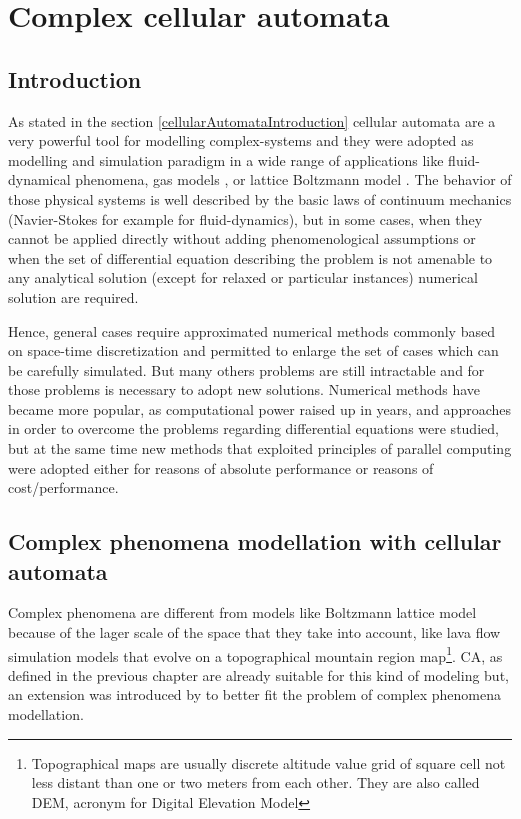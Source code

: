 \chapter{Complex cellular automata}

\section{Introduction}
As stated in the section \ref{cellularAutomataIntroduction} cellular automata
are a very powerful tool for modelling complex-systems and they were adopted as
modelling and simulation paradigm in a wide range of applications like
fluid-dynamical phenomena, gas models \cite{Frisch1986}, or lattice Boltzmann
model \cite{Chopard1999}.
The behavior of those physical systems is well described  by the basic laws
of continuum mechanics (Navier-Stokes for example for fluid-dynamics),
but in some cases, when  they cannot be applied directly without adding
phenomenological assumptions or when the set of differential equation
describing the problem is not amenable to any analytical solution (except for
relaxed or particular instances) numerical solution are required.

Hence, general cases require approximated numerical methods commonly based on
space-time discretization and permitted to enlarge the set of cases which can be
carefully simulated.
But many others problems are still intractable and for those problems is
necessary to adopt new solutions. Numerical methods have became more
popular, as computational power raised up in years, and approaches in order to
overcome the problems regarding differential equations\cite{Toffoli1984} were
studied, but at the same time new methods that exploited principles of parallel
computing were adopted either for reasons of absolute performance or reasons of
cost/performance.

\section{Complex phenomena modellation with cellular automata}
Complex phenomena are different from models like Boltzmann lattice model
because of the lager scale of the space that they take into account, like lava
flow simulation models that evolve on a topographical mountain
region map\footnote{Topographical maps are usually discrete altitude value grid
of square cell not less distant than one or two meters from each other. They are
also called DEM, acronym for Digital Elevation Model}.
CA, as defined in the previous chapter are already suitable for this kind of modeling
but, an extension  was introduced by \cite{Gregorio1999} to better fit the
problem of complex phenomena modellation.


